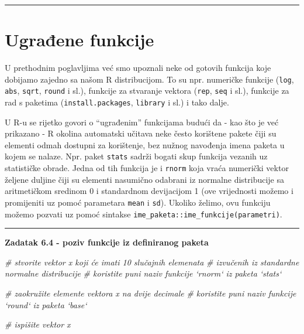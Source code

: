\documentclass[]{book}
\newenvironment{Shaded}{\begin{snugshade}}{\end{snugshade}}
\newcommand{\CommentTok}[1]{\textcolor[rgb]{0.56,0.35,0.01}{\textit{#1}}}
\theoremstyle{definition}
\theoremstyle{definition}
\theoremstyle{definition}
\theoremstyle{remark}
\begin{document}
\begin{center}\rule{0.5\linewidth}{\linethickness}\end{center}

\section{Ugrađene funkcije}\label{ugraene-funkcije}

U prethodnim poglavljima već smo upoznali neke od gotovih funkcija koje
dobijamo zajedno sa našom R distribucijom. To su npr. numeričke funkcije
(\texttt{log}, \texttt{abs}, \texttt{sqrt}, \texttt{round} i sl.),
funkcije za stvaranje vektora (\texttt{rep}, \texttt{seq} i sl.),
funkcije za rad s paketima (\texttt{install.packages}, \texttt{library}
i sl.) i tako dalje.

U R-u se rijetko govori o ``ugrađenim'' funkcijama budući da - kao što
je već prikazano - R okolina automatski učitava neke često korištene
pakete čiji su elementi odmah dostupni za korištenje, bez nužnog
navođenja imena paketa u kojem se nalaze. Npr. paket \texttt{stats}
sadrži bogati skup funkcija vezanih uz statističke obrade. Jedna od tih
funkcija je i \texttt{rnorm} koja vraća numerički vektor željene duljine
čiji su elementi nasumično odabrani iz normalne distribucije sa
aritmetičkom sredinom 0 i standardnom devijacijom 1 (ove vrijednosti
možemo i promijeniti uz pomoć parametara \texttt{mean} i \texttt{sd}).
Ukoliko želimo, ovu funkciju možemo pozvati uz pomoć sintakse
\texttt{ime\_paketa::ime\_funkcije(parametri)}.

\begin{center}\rule{0.5\linewidth}{\linethickness}\end{center}

\textbf{Zadatak 6.4 - poziv funkcije iz definiranog paketa}

\begin{Shaded}
\begin{Highlighting}[]
\CommentTok{# stvorite vektor x koji će imati 10 slučajnih elemenata}
\CommentTok{# izvučenih iz standardne normalne distribucije}
\CommentTok{# koristite puni naziv funkcije `rnorm` iz paketa `stats`}


\CommentTok{# zaokružite elemente vektora x na dvije decimale}
\CommentTok{# koristite puni naziv funkcije `round` iz paketa `base`}

\CommentTok{# ispišite vektor x}
\end{Highlighting}
\end{Shaded}
\end{document}

